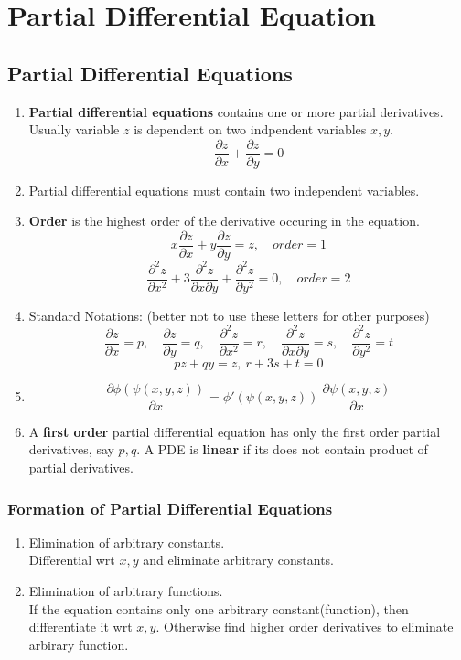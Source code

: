 \chapter{Partial Differential Equation}
\section{Partial Differential Equations}
\begin{enumerate}
	\item \textbf{Partial differential equations} contains one or more partial derivatives. Usually variable $z$ is dependent on two indpendent variables $x,y$.
		$$ \frac{\partial z}{\partial x} + \frac{\partial z}{\partial y} = 0$$
	\item Partial differential equations must contain two independent variables.
	\item \textbf{Order} is the highest order of the derivative occuring in the equation.
		$$ x\frac{\partial z}{\partial x} + y \frac{\partial z}{\partial y} = z,\quad order = 1$$
		$$ \frac{\partial ^2z}{\partial x^2} + 3\frac{\partial^2 z}{\partial x \partial y} + \frac{\partial^2 z}{\partial y^2} = 0, \quad order = 2$$
	\item Standard Notations: (better not to use these letters for other purposes)
		$$ \frac{\partial z}{\partial x} = p,\quad \frac{\partial z}{\partial y} = q,\quad \frac{\partial^2 z}{\partial x^2} = r,\quad \frac{\partial^2 z}{\partial x \partial y} = s,\quad \frac{\partial^2 z}{\partial y^2} = t$$
		$$ pz+qy = z,\ r+3s+t = 0$$
	\item $$ \frac{\partial \phi(\psi(x,y,z))}{\partial x} = \phi'(\psi(x,y,z))\ \frac{\partial \psi(x,y,z)}{\partial x} $$
	\item A \textbf{first order} partial differential equation has only the first order partial derivatives, say $p,q$. A PDE is \textbf{linear} if its does not contain product of partial derivatives.
\end{enumerate}

\subsection{Formation of Partial Differential Equations}
\begin{enumerate}
	\item Elimination of arbitrary constants.\\
		Differential wrt $x,y$ and eliminate arbitrary constants.
	\item Elimination of arbitrary functions.\\
		If the equation contains only one arbitrary constant(function), then differentiate it wrt $x,y$. Otherwise find higher order derivatives to eliminate arbirary function.
\end{enumerate}

